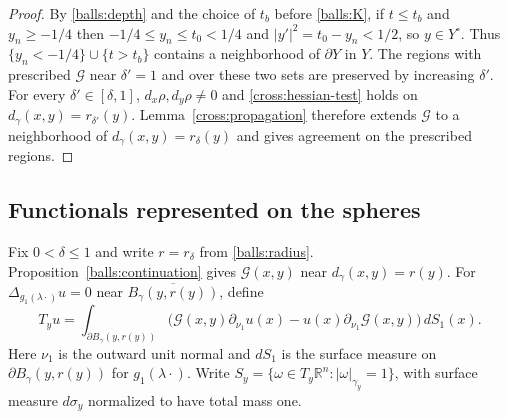\documentclass[11pt,a4paper]{article}
\theoremstyle{definition}
\theoremstyle{remark}
\numberwithin{equation}{section}
\begin{document}
\begin{proof}
By \eqref{balls:depth} and the choice of $t_b$ before \eqref{balls:K},
if $t\leq t_b$ and $y_n\geq-1/4$ then $-1/4\leq y_n\leq t_0<1/4$
and $|y'|^2=t_0-y_n<1/2$, so $y\in Y^\circ$. Thus
$\{y_n<-1/4\}\cup\{t>t_b\}$ contains a neighborhood of $\partial Y$
in $Y$. The regions with prescribed $\mathcal G$ near $\delta'=1$
and over these two sets are preserved by increasing $\delta'$.
For every $\delta'\in[\delta,1]$, $d_x\rho,d_y\rho\ne0$ and
\eqref{cross:hessian-test} holds on $d_\gamma(x,y)=r_{\delta'}(y)$.
Lemma~\ref{cross:propagation} therefore extends $\mathcal G$ to a
neighborhood of $d_\gamma(x,y)=r_\delta(y)$ and gives agreement on
the prescribed regions.
\end{proof}

\subsection{Functionals represented on the spheres}

Fix $0<\delta\le1$ and write $r=r_\delta$ from \eqref{balls:radius}.
Proposition~\ref{balls:continuation} gives $\mathcal G(x,y)$ near
$d_\gamma(x,y)=r(y)$. For $\Delta_{g_1(\lambda\cdot)}u=0$ near
$\overline{B_\gamma(y,r(y))}$, define
\begin{equation}\label{balls:flux}
 T_yu=\int_{\partial B_\gamma(y,r(y))}
  \bigl(\mathcal G(x,y)\partial_{\nu_1}u(x)
       -u(x)\partial_{\nu_1}\mathcal G(x,y)\bigr)\,dS_1(x).
\end{equation}
Here $\nu_1$ is the outward unit normal and $dS_1$ is the surface
measure on $\partial B_\gamma(y,r(y))$ for $g_1(\lambda\cdot)$.
Write $S_y=\{\omega\in T_y\mathbb R^n:|\omega|_{\gamma_y}=1\}$, with
surface measure $d\sigma_y$ normalized to have total mass one.
\end{document}
